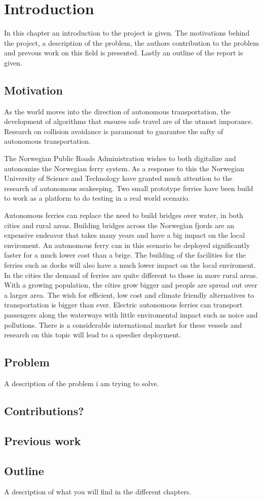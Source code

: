 
\chapter{Introduction}
In this chapter an introduction to the project is given. The motivations behind the project,
a description of the problem, the authors contribution to the problem and prevous work on this
field is presented. Lastly an outline of the report is given. 

\section{Motivation}
As the world moves into the direction of autonomous transportation, the development of
algorithms that ensures safe travel are of the utmost imporance. Research on 
collision avoidance is paramount to guarantee the safty of autonomous transportation.

The Norwegian Public Roads Administration wishes to both digitalize and autonomize the Norwegian
ferry system. As a response to this the Norwegian University of Science and Technology have
granted much attention to the research of autonomous seakeeping. Two small prototype ferries have
been build to work as a platform to do testing in a real world scenario.

Autonomous ferries can replace the need to build bridges over water, in both cities and rural areas.
Building bridges across the Norwegian fjords are an expensive endeavor that takes many years and 
have a big impact on the local enviroment. An autonomous ferry can in this scenario be deployed
significantly faster for a much lower cost than a brige. The building of the facilities for the ferries such as
docks will also have a much lower impact on the local enviroment. In the cities the demand of ferries are quite
different to those in more rural areas. With a growing population, the cities grow bigger and people
are spread out over a larger area. The wish for efficient, low cost and climate friendly alternatives to transportation
is bigger than ever. Electric autonomous ferries can transport passengers along the waterways with little enviromental impact
such as noice and pollutions. There is a considerable international market for these vessels and research on this topic will
lead to a speedier deployment. 


\section{Problem}
A description of the problem i am trying to solve. 

\section{Contributions?}

\section{Previous work}

\section{Outline}
A description of what you will find in the different chapters. 

\cleardoublepage